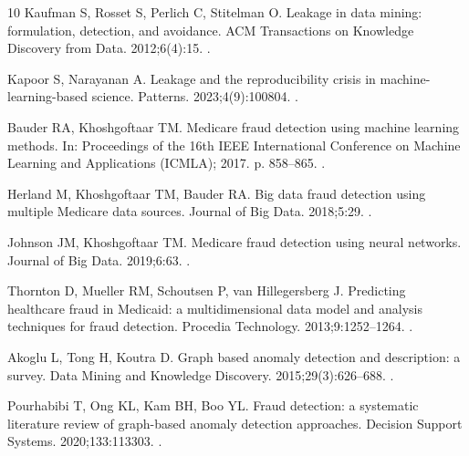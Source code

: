 \documentclass[pdflatex,sn-vancouver-num]{sn-jnl}
\begin{document}
\begin{thebibliography}{10}
Kaufman S, Rosset S, Perlich C, Stitelman O.
\newblock Leakage in data mining: formulation, detection, and avoidance.
\newblock ACM Transactions on Knowledge Discovery from Data. 2012;6(4):15.
\newblock {}.

Kapoor S, Narayanan A.
\newblock Leakage and the reproducibility crisis in machine-learning-based
  science.
\newblock Patterns. 2023;4(9):100804.
\newblock {}.

Bauder RA, Khoshgoftaar TM.
\newblock Medicare fraud detection using machine learning methods.
\newblock In: Proceedings of the 16th IEEE International Conference on Machine
  Learning and Applications (ICMLA); 2017. p. 858--865.
\newblock {}.

Herland M, Khoshgoftaar TM, Bauder RA.
\newblock Big data fraud detection using multiple {Medicare} data sources.
\newblock Journal of Big Data. 2018;5:29.
\newblock {}.

Johnson JM, Khoshgoftaar TM.
\newblock Medicare fraud detection using neural networks.
\newblock Journal of Big Data. 2019;6:63.
\newblock {}.

Thornton D, Mueller RM, Schoutsen P, van Hillegersberg J.
\newblock Predicting healthcare fraud in {Medicaid}: a multidimensional data
  model and analysis techniques for fraud detection.
\newblock Procedia Technology. 2013;9:1252--1264.
\newblock {}.

Akoglu L, Tong H, Koutra D.
\newblock Graph based anomaly detection and description: a survey.
\newblock Data Mining and Knowledge Discovery. 2015;29(3):626--688.
\newblock {}.

Pourhabibi T, Ong KL, Kam BH, Boo YL.
\newblock Fraud detection: a systematic literature review of graph-based
  anomaly detection approaches.
\newblock Decision Support Systems. 2020;133:113303.
\newblock {}.


\end{thebibliography}
\end{document}
